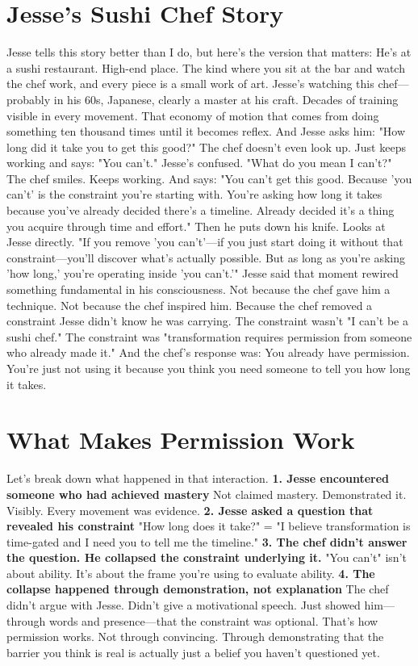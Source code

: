 \section{Jesse's Sushi Chef Story}

Jesse tells this story better than I do, but here's the version that matters:
He's at a sushi restaurant. High-end place. The kind where you sit at the bar and watch the chef work, and every piece is a small work of art.
Jesse's watching this chef—probably in his 60s, Japanese, clearly a master at his craft. Decades of training visible in every movement. That economy of motion that comes from doing something ten thousand times until it becomes reflex.
And Jesse asks him: "How long did it take you to get this good?"
The chef doesn't even look up. Just keeps working and says:
"You can't."
Jesse's confused. "What do you mean I can't?"
The chef smiles. Keeps working. And says:
"You can't get this good. Because 'you can't' is the constraint you're starting with. You're asking how long it takes because you've already decided there's a timeline. Already decided it's a thing you acquire through time and effort."
Then he puts down his knife. Looks at Jesse directly.
"If you remove 'you can't'—if you just start doing it without that constraint—you'll discover what's actually possible. But as long as you're asking 'how long,' you're operating inside 'you can't.'"
Jesse said that moment rewired something fundamental in his consciousness.
Not because the chef gave him a technique. Not because the chef inspired him.
Because the chef removed a constraint Jesse didn't know he was carrying.
The constraint wasn't "I can't be a sushi chef." The constraint was "transformation requires permission from someone who already made it."
And the chef's response was: You already have permission. You're just not using it because you think you need someone to tell you how long it takes.

\section{What Makes Permission Work}

Let's break down what happened in that interaction.
\textbf{1. Jesse encountered someone who had achieved mastery}
Not claimed mastery. Demonstrated it. Visibly. Every movement was evidence.
\textbf{2. Jesse asked a question that revealed his constraint}
"How long does it take?" = "I believe transformation is time-gated and I need you to tell me the timeline."
\textbf{3. The chef didn't answer the question. He collapsed the constraint underlying it.}
"You can't" isn't about ability. It's about the frame you're using to evaluate ability.
\textbf{4. The collapse happened through demonstration, not explanation}
The chef didn't argue with Jesse. Didn't give a motivational speech. Just showed him—through words and presence—that the constraint was optional.
That's how permission works.
Not through convincing. Through demonstrating that the barrier you think is real is actually just a belief you haven't questioned yet.

